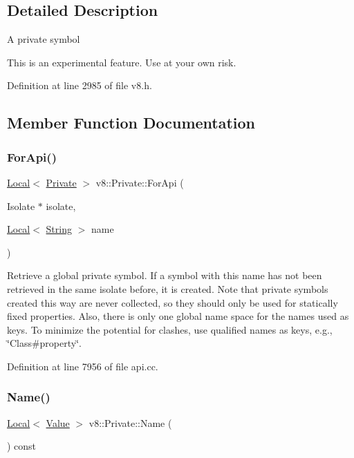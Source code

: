 \subsection{Detailed Description}
A private symbol

This is an experimental feature. Use at your own risk. 

Definition at line 2985 of file v8.\+h.



\subsection{Member Function Documentation}
\mbox{\label{classv8_1_1Private_a1a6d7c68b6761bd4b8134e4a46dbf263}} 
\subsubsection{\texorpdfstring{For\+Api()}{ForApi()}}
{\footnotesize\ttfamily \mbox{\hyperlink{classv8_1_1Local}{Local}}$<$ \mbox{\hyperlink{classv8_1_1Private}{Private}} $>$ v8\+::\+Private\+::\+For\+Api (\begin{DoxyParamCaption}\item[{Isolate $\ast$}]{isolate,  }\item[{\mbox{\hyperlink{classv8_1_1Local}{Local}}$<$ \mbox{\hyperlink{classv8_1_1String}{String}} $>$}]{name }\end{DoxyParamCaption})\hspace{0.3cm}{\ttfamily [static]}}

Retrieve a global private symbol. If a symbol with this name has not been retrieved in the same isolate before, it is created. Note that private symbols created this way are never collected, so they should only be used for statically fixed properties. Also, there is only one global name space for the names used as keys. To minimize the potential for clashes, use qualified names as keys, e.\+g., \char`\"{}\+Class\#property\char`\"{}. 

Definition at line 7956 of file api.\+cc.

\mbox{\label{classv8_1_1Private_a96d9a8cd33493038a95169ca28575327}} 
\subsubsection{\texorpdfstring{Name()}{Name()}}
{\footnotesize\ttfamily \mbox{\hyperlink{classv8_1_1Local}{Local}}$<$ \mbox{\hyperlink{classv8_1_1Value}{Value}} $>$ v8\+::\+Private\+::\+Name (\begin{DoxyParamCaption}{ }\end{DoxyParamCaption}) const}

